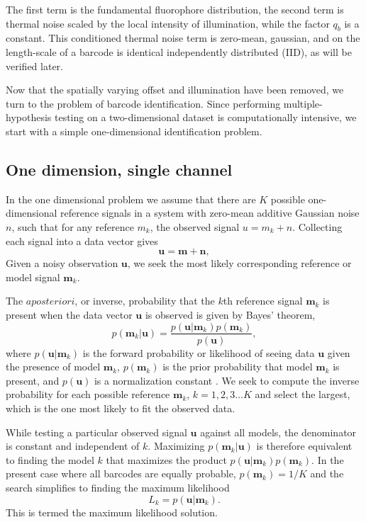 The first term is the fundamental fluorophore distribution, the second term is thermal noise scaled by the local intensity of illumination, while the factor $q_b$ is a constant. This conditioned thermal noise term is zero-mean, gaussian, and on the length-scale of a barcode is identical independently distributed (IID), as will be verified later.

Now that the spatially varying offset and illumination have been removed, we turn to the problem of barcode identification. Since performing multiple-hypothesis testing on a two-dimensional dataset is computationally intensive, we start with a simple one-dimensional identification problem. 

\subsection{One dimension, single channel}
In the one dimensional problem we assume that there are $K$ possible one-dimensional reference signals in a system with zero-mean additive Gaussian noise $n$, such that for any reference $m_k$, the observed signal $u=m_k+n$. Collecting each signal into a data vector gives
\begin{equation}
\mathbf{u}=\mathbf{m} + \mathbf{n},
\end{equation}
Given a noisy observation $\mathbf{u}$, we seek the most likely corresponding reference or model signal $\mathbf{m}_k$. 

The $a posteriori$, or inverse, probability that the $k$th reference signal $\mathbf{m}_k$ is present when the data vector $\mathbf{u}$ is observed is given by Bayes' theorem,
\begin{equation}\label{eq:Bayes}
p(\mathbf{m}_k|\mathbf{u}) = \frac{p(\mathbf{u}|\mathbf{m}_k)p(\mathbf{m}_k)} {p(\mathbf{u})},
\end{equation}
where $p(\mathbf{u}|\mathbf{m}_k)$ is the forward probability or likelihood of seeing data $\mathbf{u}$ given the presence of model $\mathbf{m}_k$, $p(\mathbf{m}_k)$ is the prior probability that model $\mathbf{m}_k$ is present, and $p(\mathbf{u})$ is a normalization constant \citep{bretthorst_probability_2003}. We seek to compute the inverse probability for each possible reference $\mathbf{m}_k$, $k=1,2,3 \ldots K$ and select the largest, which is the one most likely to fit the observed data.

While testing a particular observed signal $\mathbf{u}$ against all models, the denominator is constant and independent of $k$. Maximizing $p(\mathbf{m}_k|\mathbf{u})$ is therefore equivalent to finding the model $k$ that maximizes the product  $p(\mathbf{u}|\mathbf{m}_k)p(\mathbf{m}_k)$.
In the present case where all barcodes are equally probable,
$p(\mathbf{m}_k)=1/K$ 
and the search simplifies to finding the maximum likelihood 
\begin{equation}
L_k = p(\mathbf{u}|\mathbf{m}_k).
\end{equation}
This is termed the maximum likelihood solution.


